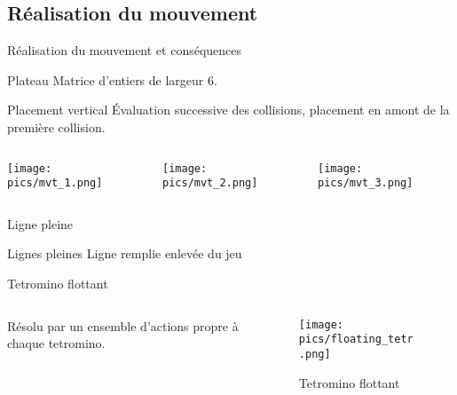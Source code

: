 \documentclass[tikz, footheight=2em]{beamer}
\begin{document}
\subsection{Réalisation du mouvement}
\begin{frame}[c]{Réalisation du mouvement et conséquences}
  \begin{block}{Plateau}
    Matrice d'entiers de largeur 6.
  \end{block}
  \begin{block}{Placement vertical}
    Évaluation successive des collisions, placement en amont de la première
    collision.
    \begin{columns}[t]
      \pause
      \begin{column}{0.33\linewidth}
        \texttt{[image: pics/mvt\_1.png]}
      \end{column}
      \pause
      \begin{column}{0.34\linewidth}
        \texttt{[image: pics/mvt\_2.png]}
      \end{column}
      \pause
      \begin{column}{0.33\linewidth}
        \texttt{[image: pics/mvt\_3.png]}
      \end{column}
    \end{columns}
  \end{block}
\end{frame}
\begin{frame}[c]{Ligne pleine}
  \begin{block}{Lignes pleines}
    Ligne remplie enlevée du jeu
  \end{block}
  \pause
  \begin{alertblock}{Tetromino flottant}
    \begin{columns}[t]
      \begin{column}{0.5\linewidth}
        Résolu par un ensemble d'actions propre à chaque tetromino.
      \end{column}
      \begin{column}{0.5\linewidth}
          \begin{figure}[H]
            \centering
            \texttt{[image: pics/floating\_tetr.png]}
            \caption{Tetromino flottant}
          \end{figure}
      \end{column}
    \end{columns}
  \end{alertblock}
\end{frame}
\end{document}
